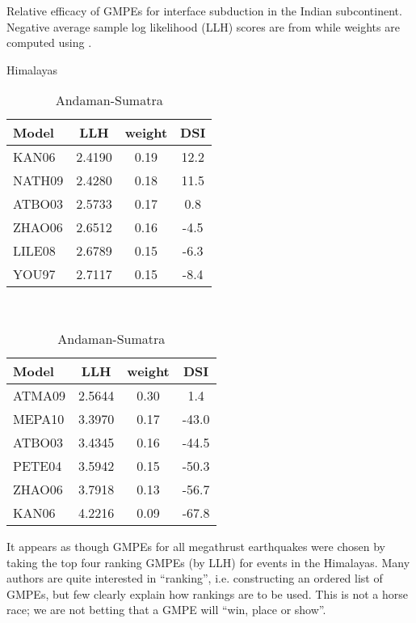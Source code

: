 \documentclass{article}
\begin{document}
\begin{appendices}
\begin{table}
\centering
\caption[Relative efficacy of GMPEs for interface subduction.]{Relative efficacy of GMPEs for interface subduction in the Indian subcontinent.
Negative average sample log likelihood (LLH) scores are from \cite[Table~5]{nath2011peak} while weights are computed using \cite{delavaud2012testing}.}
\label{table:LLH}
\begin{subtable}[b]{0.45\textwidth}
\caption{Himalayas}
\centering
\begin{tabular}{lccc}
\toprule
   Model &     LLH &  weight &   DSI \\
\midrule
   KAN06 &  2.4190 &    0.19 &  12.2 \\
  NATH09 &  2.4280 &    0.18 &  11.5 \\
  ATBO03 &  2.5733 &    0.17 &   0.8 \\
  ZHAO06 &  2.6512 &    0.16 &  -4.5 \\
  LILE08 &  2.6789 &    0.15 &  -6.3 \\
   YOU97 &  2.7117 &    0.15 &  -8.4 \\
\bottomrule
\end{tabular}
\end{subtable}
~
\begin{subtable}[b]{0.45\textwidth}
\caption{Andaman-Sumatra}
\centering
\begin{tabular}{lccc}
\toprule
   Model &     LLH &  weight &   DSI \\
\midrule
  ATMA09 &  2.5644 &    0.30 &   1.4 \\
  MEPA10 &  3.3970 &    0.17 & -43.0 \\
  ATBO03 &  3.4345 &    0.16 & -44.5 \\
  PETE04 &  3.5942 &    0.15 & -50.3 \\
  ZHAO06 &  3.7918 &    0.13 & -56.7 \\
   KAN06 &  4.2216 &    0.09 & -67.8 \\
\bottomrule
\end{tabular}
\end{subtable}
\end{table}

It appears as though GMPEs for all megathrust earthquakes were chosen by taking the top four ranking GMPEs (by LLH) for events in the Himalayas. 
Many authors \citep{scherbaum2009model, nath2011peak, delavaud2012testing, anbazhagan2015selection} are quite interested in ``ranking'', i.e. constructing an ordered list of GMPEs, but few clearly explain how rankings are to be used.
This is not a horse race; we are not betting that a GMPE will ``win, place or show''.


\end{appendices}
\end{document}
